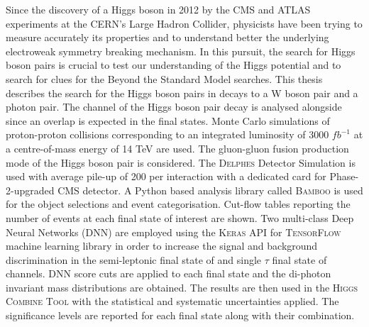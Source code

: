 Since the discovery of a Higgs boson in 2012 by the CMS and ATLAS experiments at the CERN's Large Hadron Collider, physicists have been trying to measure accurately its properties and to understand better the underlying electroweak symmetry breaking mechanism. In this pursuit, the search for Higgs boson pairs is crucial to test our understanding of the Higgs potential and to search for clues for the Beyond the Standard Model searches. This thesis describes the search for the Higgs boson pairs in decays to a W boson pair and a photon pair. The \ttgg channel of the Higgs boson pair decay is analysed alongside since an overlap is expected in the final states. Monte Carlo simulations of proton-proton collisions corresponding to an integrated luminosity of 3000 $fb^{-1}$ at a centre-of-mass energy of 14 TeV are used. The gluon-gluon fusion production mode of the Higgs boson pair is considered. The \textsc{Delphes} Detector Simulation is used with average pile-up of 200 per interaction with a dedicated card for Phase-2-upgraded CMS detector. A Python based analysis library called \textsc{Bamboo} is used for the object selections and event categorisation. Cut-flow tables reporting the number of events at each final state of interest are shown. Two multi-class Deep Neural Networks (DNN) are employed using the \textsc{Keras} API for \textsc{TensorFlow} machine learning library in order to increase the signal and background discrimination in the semi-leptonic final state of \wwgg and single $\tau$ final state of \ttgg channels. DNN score cuts are applied to each final state and the di-photon invariant mass distributions are obtained. The results are then used in the \textsc{Higgs Combine Tool} with the statistical and systematic uncertainties applied. The significance levels are reported for each final state along with their combination.